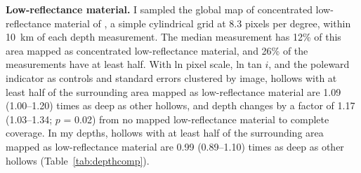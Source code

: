 \documentclass{planetary}
\begin{document}
\textbf{Low-reflectance material.} I sampled the global map of concentrated low-reflectance material of \textcite{klima2018}, a simple cylindrical grid at 8.3 pixels per degree, within 10~km of each depth measurement. The median measurement has 12\% of this area mapped as concentrated low-reflectance material, and 26\% of the measurements have at least half. With ln pixel scale, ln tan $i$, and the poleward indicator as controls and standard errors clustered by image, hollows with at least half of the surrounding area mapped as low-reflectance material are 1.09 (1.00--1.20) times as deep as other hollows, and depth changes by a factor of 1.17 (1.03--1.34; $p$ = 0.02) from no mapped low-reflectance material to complete coverage. In my depths, hollows with at least half of the surrounding area mapped as low-reflectance material are 0.99 (0.89--1.10) times as deep as other hollows (Table~\ref{tab:depthcomp}).
\end{document}
